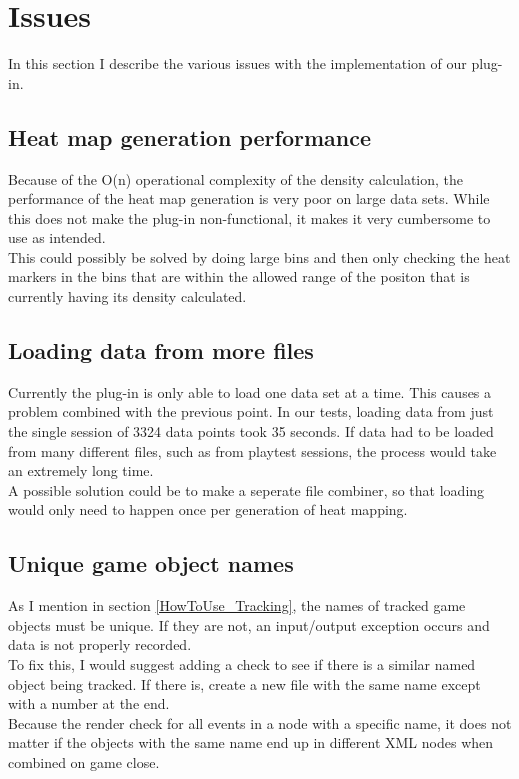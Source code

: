 \section{Issues}
\label{Issues}
In this section I describe the various issues with the implementation of our plug-in.
\subsection{Heat map generation performance}
\label{Issues_generationPerformance}
Because of the O(n) operational complexity of the density calculation, the performance of the heat map generation is very poor on large data sets. While this does not make the plug-in non-functional, it makes it very cumbersome to use as intended. 
\\This could possibly be solved by doing large bins and then only checking the heat markers in the bins that are within the allowed range of the positon that is currently having its density calculated.

\subsection{Loading data from more files}
\label{Issues_MoreFiles}
Currently the plug-in is only able to load one data set at a time. This causes a problem combined with the previous point. In our tests, loading data from just the single session of 3324 data points took 35 seconds. If data had to be loaded from many different files, such as from playtest sessions, the process would take an extremely long time. 
\\A possible solution could be to make a seperate file combiner, so that loading would only need to happen once per generation of heat mapping.

\subsection{Unique game object names}
\label{Issues_UniqueNames}
As I mention in section \ref{HowToUse_Tracking}, the names of tracked game objects must be unique. If they are not, an input/output exception occurs and data is not properly recorded. 
\\To fix this, I would suggest adding a check to see if there is a similar named object being tracked. If there is, create a new file with the same name except with a number at the end. 
\\Because the render check for all events in a node with a specific name, it does not matter if the objects with the same name end up in different XML nodes when combined on game close.

